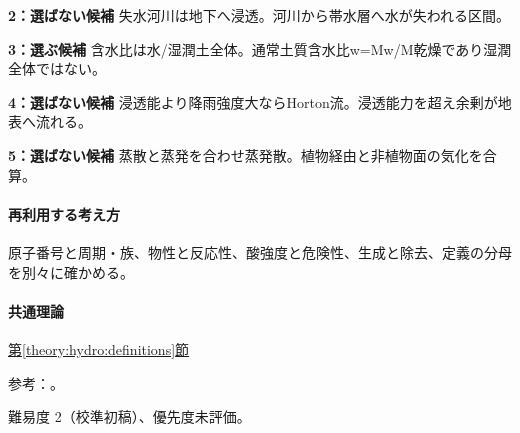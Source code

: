 \noindent\textbf{2：選ばない候補} 失水河川は地下へ浸透。河川から帯水層へ水が失われる区間。\par

\noindent\textbf{3：選ぶ候補} 含水比は水/湿潤土全体。通常土質含水比w=\allowbreak{}Mw/M乾燥であり湿潤全体ではない。\par

\noindent\textbf{4：選ばない候補} 浸透能より降雨強度大ならHorton流。浸透能力を超え余剰が地表へ流れる。\par

\noindent\textbf{5：選ばない候補} 蒸散と蒸発を合わせ蒸発散。植物経由と非植物面の気化を合算。\par

\paragraph{再利用する考え方} 原子番号と周期・族、物性と反応性、酸強度と危険性、生成と除去、定義の分母を別々に確かめる。

\paragraph{共通理論} \hyperref[theory:hydro:definitions]{第\ref*{theory:hydro:definitions}節}

\par 参考：\cite{inorganic_hydro_ref,inorganic_waterbudget}。

\par 難易度 2（校準初稿）、優先度未評価。

